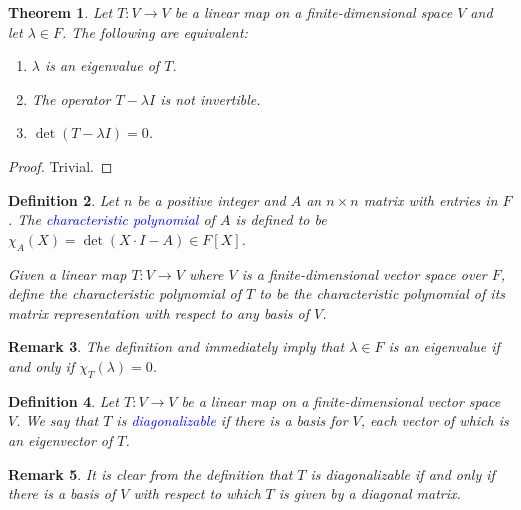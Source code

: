 \documentclass[11pt]{article}
\theoremstyle{thmstyle}
\newtheorem{theorem}{Theorem}[section]
\theoremstyle{defstyle}
\newtheorem{definition}[theorem]{Definition}
\newtheorem{remark}[theorem]{Remark}
\newcommand{\define}[1]{\textcolor{blue}{\textit{#1}}}
\begin{document}
\begin{theorem}
    Let $T\colon V\to V$ be a linear map on a finite-dimensional space $V$ and let $\lambda\in F$. The following are equivalent: 
    \begin{enumerate}[label=(\arabic*)]
        \item $\lambda$ is an eigenvalue of $T$. 
        \item The operator $T - \lambda I$ is not invertible. 
        \item $\det(T - \lambda I) = 0$.
    \end{enumerate}
\end{theorem}
\begin{proof}
    Trivial. 
\end{proof}

\begin{definition}
    Let $n$ be a positive integer and $A$ an $n\times n$ matrix with entries in $F$. The \define{characteristic polynomial} of $A$ is defined to be $\chi_A(X) = \det(X\cdot I - A)\in F[X]$.

    Given a linear map $T\colon V\to V$ where $V$ is a finite-dimensional vector space over $F$, define the characteristic polynomial of $T$ to be the characteristic polynomial of its matrix representation with respect to any basis of $V$.
\end{definition}

\begin{remark}
    The definition and  immediately imply that $\lambda\in F$ is an eigenvalue if and only if $\chi_T(\lambda) = 0$.
\end{remark}

\begin{definition}
    Let $T\colon V\to V$ be a linear map on a finite-dimensional vector space $V$. We say that $T$ is \define{diagonalizable} if there is a basis for $V$, each vector of which is an eigenvector of $T$.
\end{definition}

\begin{remark}
    It is clear from the definition that $T$ is diagonalizable if and only if there is a basis of $V$ with respect to which $T$ is given by a diagonal matrix.
\end{remark}
\end{document}
